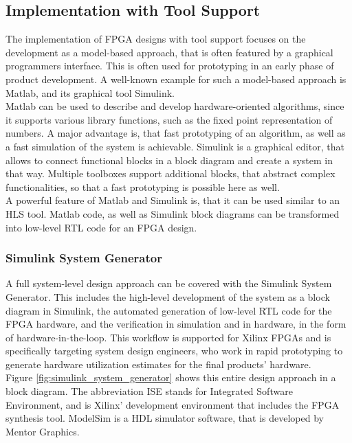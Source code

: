 \subsection{Implementation with Tool Support}

The implementation of FPGA designs with tool support focuses on the development as a model-based approach, that is often featured by a graphical programmers interface.
This is often used for prototyping in an early phase of product development.
A well-known example for such a model-based approach is Matlab, and its graphical tool Simulink.\\

Matlab can be used to describe and develop hardware-oriented algorithms, since it supports various library functions, such as the fixed point representation of numbers.
A major advantage is, that fast prototyping of an algorithm, as well as a fast simulation of the system is achievable.
Simulink is a graphical editor, that allows to connect functional blocks in a block diagram and create a system in that way.
Multiple toolboxes support additional blocks, that abstract complex functionalities, so that a fast prototyping is possible here as well.\\

A powerful feature of Matlab and Simulink is, that it can be used similar to an HLS tool.
Matlab code, as well as Simulink block diagrams can be transformed into low-level RTL code for an FPGA design.

\subsubsection{Simulink System Generator}

A full system-level design approach can be covered with the Simulink System Generator.
This includes the high-level development of the system as a block diagram in Simulink, the automated generation of low-level RTL code for the FPGA hardware, and the verification in simulation and in hardware, in the form of hardware-in-the-loop.
This workflow is supported for Xilinx FPGAs and is specifically targeting system design engineers, who work in rapid prototyping to generate hardware utilization estimates for the final products' hardware.\\

Figure \ref{fig:simulink_system_generator} shows this entire design approach in a block diagram.
The abbreviation ISE stands for Integrated Software Environment, and is Xilinx' development environment that includes the FPGA synthesis tool.
ModelSim is a HDL simulator software, that is developed by Mentor Graphics.

